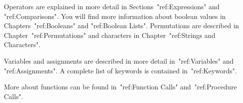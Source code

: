 Operators are explained in more detail in Sections~"ref:Expressions" and
"ref:Comparisons".
You will find more information about boolean values in
Chapters~"ref:Booleans" and "ref:Boolean Lists".
Permutations are described in Chapter~"ref:Permutations" and characters
in Chapter~"ref:Strings and Characters".

Variables and assignments are described in more detail in~"ref:Variables"
and "ref:Assignments".
A complete list of keywords is contained in~"ref:Keywords".

More about functions can be found in~"ref:Function Calls"
and~"ref:Procedure Calls".



